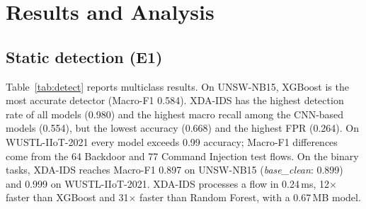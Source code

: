 \documentclass[pdflatex,sn-mathphys-num]{sn-jnl}%
\begin{document}
\section{Results and Analysis}\label{sec:results}
\subsection{Static detection (E1)}
Table~\ref{tab:detect} reports multiclass results. On UNSW-NB15, XGBoost is the most accurate detector (Macro-F1 0.584). XDA-IDS has the highest detection rate of all models (0.980) and the highest macro recall among the CNN-based models (0.554), but the lowest accuracy (0.668) and the highest FPR (0.264). On WUSTL-IIoT-2021 every model exceeds 0.99 accuracy; Macro-F1 differences come from the 64 Backdoor and 77 Command Injection test flows. On the binary tasks, XDA-IDS reaches Macro-F1 0.897 on UNSW-NB15 (\textit{base\_clean}: 0.899) and 0.999 on WUSTL-IIoT-2021. XDA-IDS processes a flow in 0.24\,ms, 12$\times$ faster than XGBoost and 31$\times$ faster than Random Forest, with a 0.67\,MB model.
\end{document}
